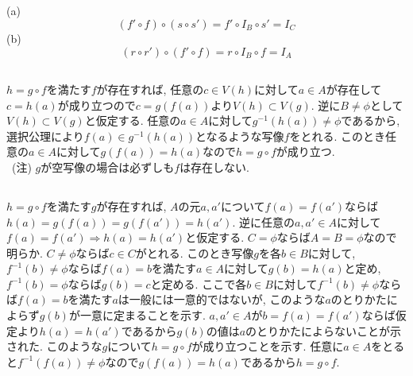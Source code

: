 \documentclass{jsarticle}
\begin{document}
\subsection{} %
\noindent
(a)
\begin{equation*}
	(f' \circ f) \circ (s \circ s') = f' \circ I_B \circ s' = I_C
\end{equation*}
(b)
\begin{equation*}
	(r \circ r') \circ (f' \circ f) = r \circ I_B \circ f = I_A
\end{equation*}

\subsection{} %
$h = g \circ f$を満たす$f$が存在すれば, 任意の$c \in V(h)$に対して$a \in A$が存在して$c = h(a)$が成り立つので$c = g(f(a))$より$V(h) \subset V(g)$. 逆に$B \neq \phi$として$V(h) \subset V(g)$と仮定する. 任意の$a \in A$に対して$g^{-1}(h(a)) \neq \phi$であるから, 選択公理により$f(a) \in g^{-1}(h(a))$となるような写像$f$をとれる. このとき任意の$a \in A$に対して$g(f(a)) = h(a)$なので$h = g \circ f$が成り立つ.\\
\footnotesize
\ (注) $g$が空写像の場合は必ずしも$f$は存在しない.
\normalsize

\subsection{} %
$h = g \circ f$を満たす$g$が存在すれば, $A$の元$a, a'$について$f(a) = f(a')$ならば$h(a) = g(f(a)) = g(f(a')) = h(a')$. 逆に任意の$a, a' \in A$に対して$f(a) = f(a') \Rightarrow h(a) = h(a')$と仮定する. $C = \phi$ならば$A = B = \phi$なので明らか. $C \neq \phi$ならば$c \in C$がとれる. このとき写像$g$を各$b \in B$に対して, $f^{-1}(b) \neq \phi$ならば$f(a) = b$を満たす$a \in A$に対して$g(b) = h(a)$と定め,  $f^{-1}(b) = \phi$ならば$g(b) = c$と定める. ここで各$b \in B$に対して$f^{-1}(b) \neq \phi$ならば$f(a) = b$を満たす$a$は一般には一意的ではないが, このような$a$のとりかたによらず$g(b)$が一意に定まることを示す. $a, a' \in A$が$b = f(a) = f(a')$ならば仮定より$h(a) = h(a')$であるから$g(b)$の値は$a$のとりかたによらないことが示された. このような$g$について$h = g \circ f$が成り立つことを示す. 任意に$a \in A$をとると$f^{-1}(f(a)) \neq \phi$なので$g(f(a)) = h(a)$であるから$h = g \circ f$.
\end{document}
